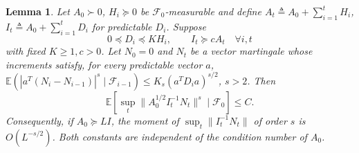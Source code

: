 \documentclass[11pt,reqno]{amsart}
\numberwithin{equation}{section}
\newtheorem{lemma}[theorem]{Lemma}
\theoremstyle{definition}
\theoremstyle{remark}
\newcommand{\E}{\mathbb E}
\newcommand{\F}{\mathcal F}
\begin{document}
\begin{lemma}\label{lem:firmaxt}
Let $A_0\succ0$, $H_i\succeq0$ be $\F_0$-measurable and define $A_t\triangleq A_0+\sum_{i=1}^tH_i$, $I_t\triangleq A_0+\sum_{i=1}^tD_i$ for predictable $D_i$. Suppose
\begin{equation*}
 0\preceq D_i\preceq KH_i,\qquad I_t\succeq cA_t\quad\forall i,t
\end{equation*}
with fixed $K\ge1,c>0$. Let $N_0=0$ and $N_t$ be a vector martingale whose increments satisfy, for every predictable vector $a$,
$\E(|a^T(N_i-N_{i-1})|^s\mid\F_{i-1})\le K_s(a^T D_i a)^{s/2}$, $s>2$. Then
\begin{equation*}
 \E\left[\sup_t\|A_0^{1/2}I_t^{-1}N_t\|^s\mid\F_0\right]\le C.
\end{equation*}
Consequently, if $A_0\succeq LI$, the moment of $\sup_t\|I_t^{-1}N_t\|$ of order $s$ is $O(L^{-s/2})$. Both constants are independent of the condition number of $A_0$.
\end{lemma}
\end{document}
